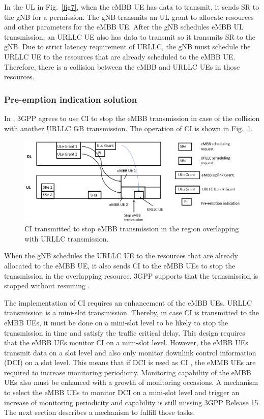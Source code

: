 \documentclass{ieeeaccess}
\begin{document}
In the UL in Fig.~\ref{fig7}, when the eMBB UE has data to transmit, it sends SR to the gNB for a permission. The gNB transmits an UL grant to allocate resources and other parameters for the eMBB UE. After the gNB schedules eMBB UL transmission, an URLLC UE also has data to transmit so it transmits SR to the gNB. Due to strict latency requirement of URLLC, the gNB must schedule the URLLC UE to the resources that are already scheduled to the eMBB UE. Therefore, there is a collision between the eMBB and URLLC UEs in those resources.

\subsubsection{Pre-emption indication solution}

In \cite{ref20}, 3GPP agrees to use CI to stop the eMBB transmission in case of the collision with another URLLC GB transmission. The operation of CI is shown in Fig.~\ref{fig8}.

\begin{figure}[htbp]
\centerline{\includegraphics[scale=0.33]{fig8.PNG}}
\caption{CI transmitted to stop eMBB transmission in the region overlapping with URLLC transmission.}
\label{fig8}
\vspace{-2mm}
\end{figure}

When the gNB schedules the URLLC UE to the resources that are already allocated to the eMBB UE, it also sends CI to the eMBB UEs to stop the transmission in the overlapping resource. 3GPP supports that the transmission is stopped without resuming \cite{ref20}. 

The implementation of CI requires an enhancement of the eMBB UEs. URLLC transmission is a mini-slot transmission. Thereby, in case CI is transmitted to the eMBB UEs, it must be done on a mini-slot level to be likely to stop the transmission in time and satisfy the traffic critical delay. This design requires that the eMBB UEs monitor CI on a mini-slot level. However, the eMBB UEs transmit data on a slot level and also only monitor downlink control information (DCI) on a slot level. This means that if DCI is used as CI \cite{ref20}, the eMMB UEs are required to increase monitoring periodicity. Monitoring capability of the eMBB UEs also must be enhanced with a growth of monitoring occasions. A mechanism to select the eMBB UEs to monitor DCI on a mini-slot level and trigger an increase of monitoring periodicity and capability is still missing 3GPP Release 15. The next section describes a mechanism to fulfill those tasks. 
\end{document}
